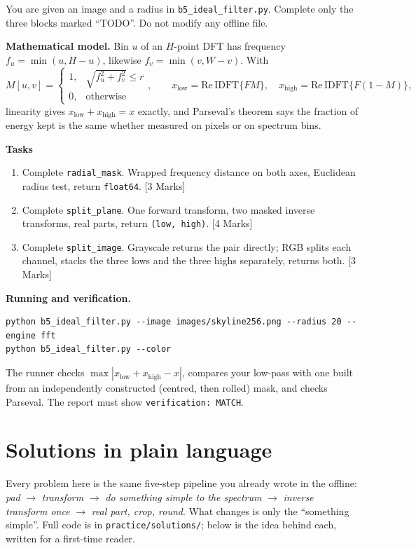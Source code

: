 \documentclass[11pt]{article}
\newcommand{\file}[1]{\texttt{#1}}
\newcommand{\code}[1]{\texttt{#1}}
\begin{document}
You are given an image and a radius in \file{b5\_ideal\_filter.py}. Complete
only the three blocks marked ``TODO''. Do not modify any offline file.

\textbf{Mathematical model.} Bin $u$ of an $H$-point DFT has frequency
$f_u = \min(u, H - u)$, likewise $f_v = \min(v, W - v)$. With
\[
  M[u,v] = \begin{cases} 1, & \sqrt{f_u^2 + f_v^2} \le r \\ 0, & \text{otherwise} \end{cases},
  \qquad
  x_{\text{low}} = \mathrm{Re}\,\mathrm{IDFT}\{F M\}, \quad
  x_{\text{high}} = \mathrm{Re}\,\mathrm{IDFT}\{F (1 - M)\},
\]
linearity gives $x_{\text{low}} + x_{\text{high}} = x$ exactly, and Parseval's
theorem says the fraction of energy kept is the same whether measured on pixels
or on spectrum bins.

\textbf{Tasks}
\begin{enumerate}[nosep]
  \item Complete \code{radial\_mask}. Wrapped frequency distance on both axes,
        Euclidean radius test, return \code{float64}.
        \hfill [3 Marks]
  \item Complete \code{split\_plane}. One forward transform, two masked
        inverse transforms, real parts, return \code{(low, high)}.
        \hfill [4 Marks]
  \item Complete \code{split\_image}. Grayscale returns the pair directly; RGB
        splits each channel, stacks the three lows and the three highs
        separately, returns both.
        \hfill [3 Marks]
\end{enumerate}

\textbf{Running and verification.}
\begin{lstlisting}
python b5_ideal_filter.py --image images/skyline256.png --radius 20 --engine fft
python b5_ideal_filter.py --color
\end{lstlisting}
The runner checks $\max|x_{\text{low}} + x_{\text{high}} - x|$, compares your
low-pass with one built from an independently constructed (centred, then
rolled) mask, and checks Parseval. The report must show
\code{verification: MATCH}.

\newpage
\section*{Solutions in plain language}

Every problem here is the same five-step pipeline you already wrote in the
offline: \emph{pad} $\to$ \emph{transform} $\to$ \emph{do something simple to
the spectrum} $\to$ \emph{inverse transform once} $\to$ \emph{real part, crop,
round}. What changes is only the ``something simple''. Full code is in
\file{practice/solutions/}; below is the idea behind each, written for a
first-time reader.
\end{document}
